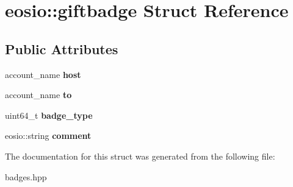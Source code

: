 \hypertarget{structeosio_1_1giftbadge}{}\section{eosio\+:\+:giftbadge Struct Reference}
\label{structeosio_1_1giftbadge}
\subsection*{Public Attributes}
\begin{DoxyCompactItemize}
\item 
\mbox{\label{structeosio_1_1giftbadge_a627e0b026fa5dbd733c614e91d4620e6}} 
account\+\_\+name {\bfseries host}
\item 
\mbox{\label{structeosio_1_1giftbadge_aef3b6ff33f4e99c45882c33b680739dc}} 
account\+\_\+name {\bfseries to}
\item 
\mbox{\label{structeosio_1_1giftbadge_a0fbcb1dcbb39ca0da6da2df5ed9e1cbb}} 
uint64\+\_\+t {\bfseries badge\+\_\+type}
\item 
\mbox{\label{structeosio_1_1giftbadge_a8650614e1d85c99c884e91b0921c4e72}} 
eosio\+::string {\bfseries comment}
\end{DoxyCompactItemize}


The documentation for this struct was generated from the following file\+:\begin{DoxyCompactItemize}
\item 
badges.\+hpp\end{DoxyCompactItemize}

